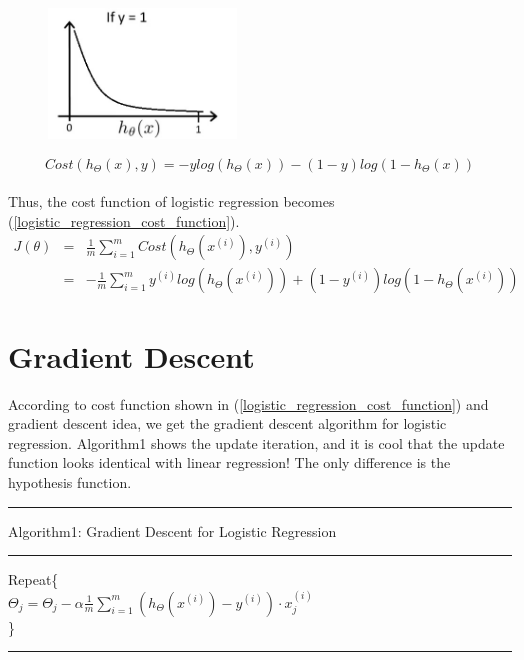 \documentclass{article}
\begin{document}
\begin{figure}[ht]
  \centering
  \includegraphics[width=5cm]{Figure4.jpg}\\
  \caption{}\label{cost_fuction_log_plot}
\end{figure}

\begin{equation}\label{simple_logistic_regression_example_cost_function}
Cost(h_{\Theta}(x), y) = -ylog(h_{\Theta}(x)) - (1 - y)log(1 - h_{\Theta}(x))
\end{equation}
\\
Thus, the cost function of logistic regression becomes (\ref{logistic_regression_cost_function}).
\begin{eqnarray}\label{logistic_regression_cost_function}
  J(\theta) &   =   &\frac{1}{m} \sum_{i=1}^{m} Cost(h_{\Theta}(x^{(i)}), y^{(i)})\\
            &   =   &-\frac{1}{m} \sum_{i=1}^{m} y^{(i)}log(h_{\Theta}(x^{(i)})) + (1 - y^{(i)})log(1 - h_{\Theta}(x^{(i)}))
\end{eqnarray}

\section{Gradient Descent}
According to cost function shown in (\ref{logistic_regression_cost_function}) and gradient descent idea, we get the gradient descent algorithm for logistic regression. Algorithm1 shows the update iteration, and it is cool that the update function looks identical with linear regression! The only difference is the hypothesis function.
\smallskip
\hrule
\smallskip
Algorithm1: Gradient Descent for Logistic Regression
\smallskip
\hrule
\smallskip
Repeat\{\\
$\Theta_j=\Theta_j - \alpha \frac{1}{m} \sum_{i=1}^{m}(h_\Theta(x^{(i)})-y^{(i)}) \cdot x^{(i)}_{j}$\\
\}\\
\hrule
\end{document}
